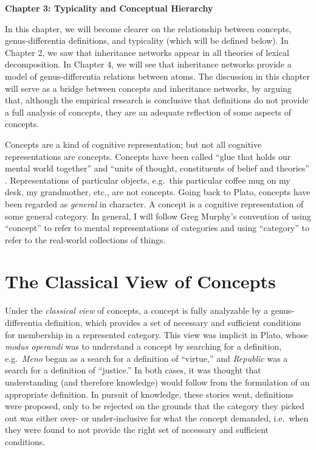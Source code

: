 \begin{center}
\Large \textbf{Chapter 3: Typicality and Conceptual Hierarchy} \\[1ex]
\end{center} 
\setcounter{section}{0}
In this chapter, we will become clearer on the relationship between concepts, genus-differentia definitions, and typicality (which will be defined below). In Chapter 2, we saw that inheritance networks appear in all theories of lexical decomposition. In Chapter 4, we will see that inheritance networks provide a model of genus-differentia relations between atoms. The discussion in this chapter will serve as a bridge between concepts and inheritance networks, by arguing that, although the empirical research is conclusive that definitions do not provide a full analysis of concepts, they are an adequate reflection of some aspects of concepts.

Concepts are a kind of cognitive representation; but not all cognitive representations are concepts. Concepts have been called ``glue that holds our mental world together'' \cite{murphy_big_2002} and ``units of thought, constituents of belief and theories'' \cite{carey_origin_2009}.  Representations of particular objects, e.g.\ this particular coffee mug on my desk, my grandmother, etc., are not concepts. Going back to Plato, concepts have been regarded as \emph{general} in character. A concept is a cognitive representation of some general category. In general, I will follow Greg Murphy's convention of using ``concept'' to refer to mental representations of categories and using ``category'' to refer to the real-world collections of things.

\section{The Classical View of Concepts}

Under the \emph{classical view} of concepts, a concept is fully analyzable by a genus-differentia definition, which provides a set of necessary and sufficient conditions for membership in a represented category. This view was implicit in Plato, whose \emph{modus operandi} was to understand a concept by searching for a definition, e.g.\ \emph{Meno} began as a search for a definition of ``virtue,'' and \emph{Republic} was a search for a definition of ``justice.'' In both cases, it was thought that understanding (and therefore knowledge) would follow from the formulation of an appropriate definition. In pursuit of knowledge, these stories went, definitions were proposed, only to be rejected on the grounds that the category they picked out was either over- or under-inclusive for what the concept demanded, i.e.\ when they were found to not provide the right set of necessary and sufficient conditions.

